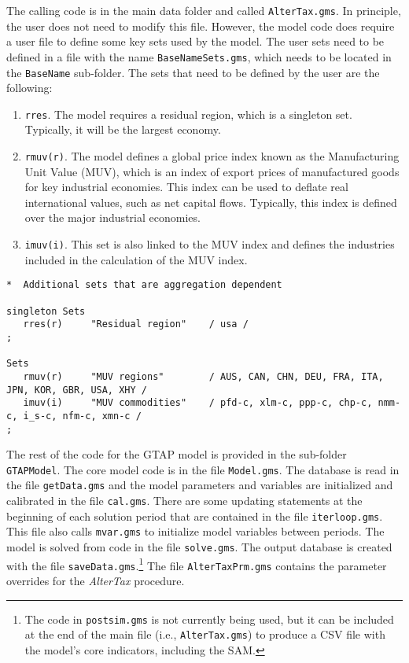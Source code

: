 The calling code is in the main data folder and
called \texttt{AlterTax.gms}. In principle, the user
does not need to modify this file.
However, the model code does require a
user file to define some key sets used by the model.
The user sets need to be defined in a file
with the name \texttt{BaseNameSets.gms}, which
needs to be located in the \texttt{BaseName} sub-folder.
The sets that need to be defined by the user are the following:
\begin{enumerate}
\item \texttt{rres}. The model requires a residual region, which
is a singleton set. Typically, it will be the largest economy.
\item \texttt{rmuv(r)}. The model defines a global price index
known as the Manufacturing Unit Value (MUV), which is an index
of export prices of manufactured goods for key industrial economies. This
index can be used to deflate real international values, such as net capital
flows. Typically, this index is defined over the major industrial economies.
\item \texttt{imuv(i)}. This set is also linked to the MUV index
and defines the industries included in the calculation of the MUV index.
\end{enumerate}

\begin{lstlisting}[language=GAMS, caption={User defined sets for the AlterTax procedure}, label=lst:AlterTaxUserSets]
*  Additional sets that are aggregation dependent

singleton Sets
   rres(r)     "Residual region"    / usa /
;

Sets
   rmuv(r)     "MUV regions"        / AUS, CAN, CHN, DEU, FRA, ITA, JPN, KOR, GBR, USA, XHY /
   imuv(i)     "MUV commodities"    / pfd-c, xlm-c, ppp-c, chp-c, nmm-c, i_s-c, nfm-c, xmn-c /
;
\end{lstlisting}

The rest of the code for the GTAP model is
provided in the sub-folder \texttt{GTAPModel}. The core
model code is in the file \texttt{Model.gms}. The database
is read in the file \texttt{getData.gms} and the model
parameters and variables are initialized and calibrated
in the file \texttt{cal.gms}.
There are some updating statements at the beginning
of each solution period that are contained
in the file \texttt{iterloop.gms}. This file
also calls \texttt{mvar.gms} to initialize model variables
between periods. The model
is solved from code in the file \texttt{solve.gms}.
The output database is created with the file \texttt{saveData.gms}.\footnote{The
code in \texttt{postsim.gms} is not currently being used, but it can
be included at the end of the main file (i.e., \texttt{AlterTax.gms}) to
produce a CSV file with the model's core indicators, including the SAM.}
The file \texttt{AlterTaxPrm.gms} contains the parameter overrides for
the \emph{AlterTax} procedure.

